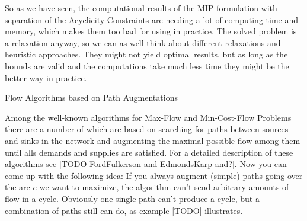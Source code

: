 So as we have seen, the computational results of the MIP formulation with separation of the Acyclicity Constraints 
are needing a lot of computing time and memory, which makes them too bad for using in practice. The solved problem is a 
relaxation anyway, so we can as well think about different relaxations and heuristic approaches. They might not yield 
optimal results, but as long as the bounds are valid and the computations take much less time they might be the better 
way in practice.

\caption{Flow Algorithms based on Path Augmentations}

Among the well-known algorithms for Max-Flow and Min-Cost-Flow Problems there are a number of which are based on 
searching for paths between sources and sinks in the network and augmenting the maximal possible flow among them until 
alls demands and supplies are satisfied. For a detailed description of these algorithms see [TODO FordFulkerson and 
EdmondsKarp and?]. 
Now you can come up with the following idea: If you always augment (simple) paths going over the arc $e$ we want to 
maximize, the algorithm can't send arbitrary amounts of flow in a cycle. Obviously one single path can't produce a 
cycle, but a combination of paths still can do, as example [TODO] illustrates. \\


